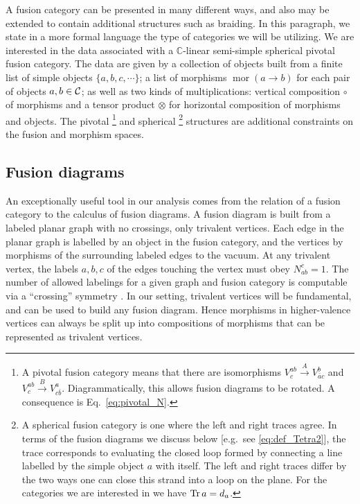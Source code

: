 A fusion category can be presented in many different ways, and also may be extended to contain additional structures such as braiding.
In this paragraph, we state in a more formal language the type of categories we will be utilizing.
We are interested in the data associated with a $\mathbb{C}$-linear semi-simple spherical pivotal fusion category. 
The data are given by a collection of objects built from a finite list of simple objects $\{a, b, c, \cdots \}$;
	a list of morphisms $\operatorname{mor}(a \to b)$ for each pair of objects $a,b \in \mathcal{C}$;
	as well as two kinds of multiplications: vertical composition $\circ$ of morphisms and a tensor product $\otimes$ for horizontal composition of morphisms and objects.
The pivotal%
	\footnote{A pivotal fusion category means that there are isomorphisms $V_c^{ab} \xrightarrow{A} V_{\bar{a}c}^b$ and $V_c^{ab} \xrightarrow{B} V_{c\bar{b}}^a$.
		Diagrammatically, this allows fusion diagrams to be rotated.  A consequence is Eq.~\eqref{eq:pivotal_N}.}
 and spherical%
	\footnote{A spherical fusion category is one where the left and right traces agree. In terms of the fusion diagrams we discuss below [e.g.\ see \eqref{eq:def_Tetra2}], the trace corresponds to evaluating the closed loop formed by connecting a line labelled by the simple object $a$ with itself.
		The left and right traces differ by the two ways one can close this strand into a loop on the plane.
		For the categories we are interested in we have $\operatorname{Tr} a = d_a$.}
	structures are additional constraints on the fusion and morphism spaces.







\subsection{Fusion diagrams}
\label{sec:fusiondiagrams}

An exceptionally useful tool in our analysis comes from the relation of a fusion category to the calculus of fusion diagrams.
A fusion diagram is built from a labeled planar graph with no crossings, only trivalent vertices.
Each edge in the planar graph is labelled by an object in the fusion category, and the 
vertices by morphisms of the surrounding labeled edges to the vacuum.
At any trivalent vertex, the labels  $a,b,c$ of the edges touching the vertex must obey $N_{ab}^c=1$. 
The number of allowed labelings for a given graph and fusion category is computable via a ``crossing'' symmetry \cite{Simon2012}.
In our setting, trivalent vertices will be fundamental, and can be used to build any fusion diagram. Hence morphisms in higher-valence vertices can always be split up into compositions of morphisms that can be represented as trivalent vertices.


